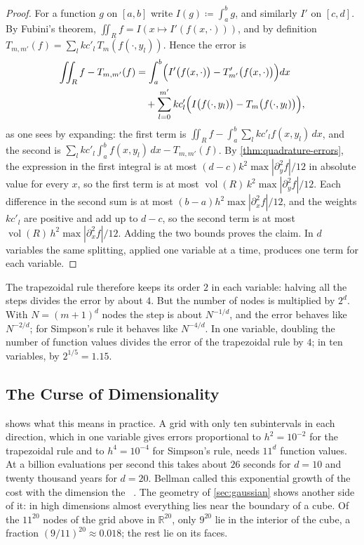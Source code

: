 \begin{proof}
For a function $g$ on $[a,b]$ write $I(g)\coloneqq\int_a^bg$, and similarly $I'$ on $[c,d]$. By Fubini's theorem, $\iint_Rf=I(x\mapsto I'(f(x,\cdot)))$, and by definition $T_{m,m'}(f)=\sum_lkc'_l\,T_m(f(\cdot,y_l))$. Hence the error is
\[
\begin{aligned}
\iint_Rf-T_{m,m'}(f)&=\int_a^b\Bigl(I'\bigl(f(x,\cdot)\bigr)-T'_{m'}\bigl(f(x,\cdot)\bigr)\Bigr)dx\\
&\quad+\sum_{l=0}^{m'}kc'_l\Bigl(I\bigl(f(\cdot,y_l)\bigr)-T_m\bigl(f(\cdot,y_l)\bigr)\Bigr),
\end{aligned}
\]
as one sees by expanding: the first term is $\iint_Rf-\int_a^b\sum_lkc'_lf(x,y_l)\,dx$, and the second is $\sum_lkc'_l\int_a^bf(x,y_l)\,dx-T_{m,m'}(f)$. By \cref{thm:quadrature-errors}, the expression in the first integral is at most $(d-c)k^2\max|\partial_y^2f|/12$ in absolute value for every $x$, so the first term is at most $\operatorname{vol}(R)\,k^2\max|\partial_y^2f|/12$. Each difference in the second sum is at most $(b-a)h^2\max|\partial_x^2f|/12$, and the weights $kc'_l$ are positive and add up to $d-c$, so the second term is at most $\operatorname{vol}(R)\,h^2\max|\partial_x^2f|/12$. Adding the two bounds proves the claim. In $d$ variables the same splitting, applied one variable at a time, produces one term for each variable.
\end{proof}

The trapezoidal rule therefore keeps its order $2$ in each variable: halving all the steps divides the error by about $4$. But the number of nodes is multiplied by $2^d$. With $N=(m+1)^d$ nodes the step is about $N^{-1/d}$, and the error behaves like $N^{-2/d}$; for Simpson's rule it behaves like $N^{-4/d}$. In one variable, doubling the number of function values divides the error of the trapezoidal rule by $4$; in ten variables, by $2^{1/5}=1.15$.

\subsection{The Curse of Dimensionality}

 shows what this means in practice. A grid with only ten subintervals in each direction, which in one variable gives errors proportional to $h^2=10^{-2}$ for the trapezoidal rule and to $h^4=10^{-4}$ for Simpson's rule, needs $11^d$ function values. At a billion evaluations per second this takes about $26$ seconds for $d=10$ and twenty thousand years for $d=20$. Bellman called this exponential growth of the cost with the dimension the ~\cite{bellman1957}. The geometry of \cref{sec:gaussian} shows another side of it: in high dimensions almost everything lies near the boundary of a cube. Of the $11^{20}$ nodes of the grid above in $\mathbb R^{20}$, only $9^{20}$ lie in the interior of the cube, a fraction $(9/11)^{20}\approx0.018$; the rest lie on its faces.


